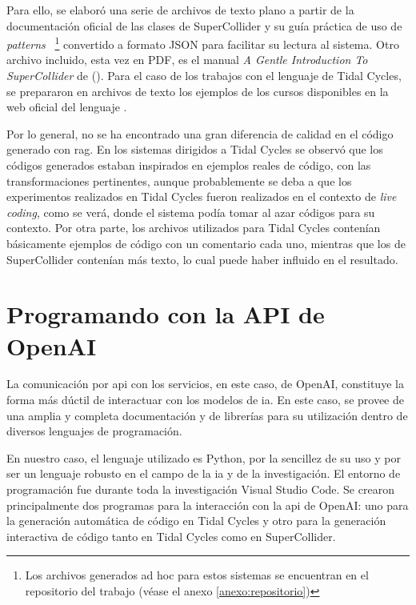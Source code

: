 Para ello, se elaboró una serie de archivos de texto plano a partir de la documentación oficial de las clases de SuperCollider y su guía práctica de uso de \emph{patterns} \citep{SuperCollider12Help}~\footnote{Los archivos generados ad hoc para estos sistemas se encuentran en el repositorio del trabajo (véase el anexo \ref{anexo:repositorio})} convertido a formato JSON para facilitar su lectura al sistema. Otro archivo incluido, esta vez en PDF, es el manual \emph{A Gentle Introduction To SuperCollider} de \citeauthor{ruviaroGentleIntroductionSuperCollider2015} (\citeyear{ruviaroGentleIntroductionSuperCollider2015}). Para el caso de los trabajos con el lenguaje de Tidal Cycles, se prepararon en archivos de texto los ejemplos de los cursos disponibles en la web oficial del lenguaje \citep{LiveCodeTidal}.

Por lo general, no se ha encontrado una gran diferencia de calidad en el código generado con \gls{rag}. En los sistemas dirigidos a Tidal Cycles se observó que los códigos generados estaban inspirados en ejemplos reales de código, con las transformaciones pertinentes, aunque probablemente se deba a que los experimentos realizados en Tidal Cycles fueron realizados en el contexto de \emph{live coding}, como se verá, donde el sistema podía tomar al azar códigos para su contexto. Por otra parte, los archivos utilizados para Tidal Cycles contenían básicamente ejemplos de código con un comentario cada uno, mientras que los de SuperCollider contenían más texto, lo cual puede haber influido en el resultado.


\section{Programando con la API de OpenAI}

La comunicación por \gls{api} con los servicios, en este caso, de OpenAI, constituye la forma más dúctil de interactuar con los modelos de \gls{ia}. En este caso, se provee de una amplia y completa documentación y de librerías para su utilización dentro de diversos lenguajes de programación.

En nuestro caso, el lenguaje utilizado es Python, por la sencillez de su uso y por ser un lenguaje robusto en el campo de la \gls{ia} y de la investigación. El entorno de programación fue durante toda la investigación Visual Studio Code. Se crearon principalmente dos programas para la interacción con la \gls{api} de OpenAI: uno para la generación automática de código en Tidal Cycles y otro para la generación interactiva de código tanto en Tidal Cycles como en SuperCollider.

